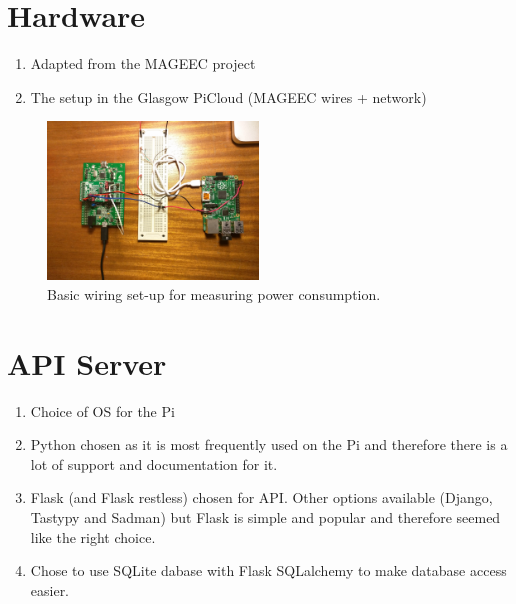\documentclass{l4proj}
\begin{document}
\section{Hardware}
\begin{enumerate}
	\item Adapted from the MAGEEC project
	\item The setup in the Glasgow PiCloud (MAGEEC wires + network)
\end{enumerate}
\begin{figure}[!ht]
  \caption{Basic wiring set-up for measuring power consumption.}
  \centering
    \includegraphics[width=0.5\textwidth]{figures/init_setup}
\end{figure}
\section{API Server}
\begin{enumerate}
	\item Choice of OS for the Pi
	\item Python chosen as it is most frequently used on the Pi and therefore there is a lot of support and documentation for it.
	\item Flask (and Flask restless) chosen for API. Other options available (Django, Tastypy and Sadman) but Flask is simple and popular and therefore seemed like the right choice.
	\item Chose to use SQLite dabase with Flask SQLalchemy to make database access easier.
\end{enumerate}
\end{document}

